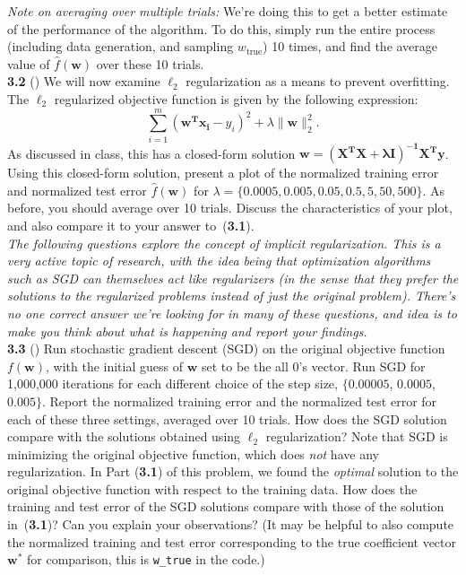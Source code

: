 \emph{Note on averaging over multiple trials:} We're doing this to get a better estimate of the performance of the algorithm. To do this, simply run the entire process (including data generation, and sampling $w_{\text{true}}$) 10 times, and find the average value of $\hat{f}(\textbf{w})$ over these 10 trials. \\


\textbf{3.2} () We will now examine $\ell_2$ regularization as a means to prevent overfitting. The $\ell_2$ regularized objective function is given by the following expression:
$$ \sum_{i=1}^{m} (\mathbf{w^T x_{i}}-{y}_{i})^2 + \lambda \| \mathbf{w}\|_2^2.$$
As discussed in class, this has a closed-form solution
$\textbf{w}=\mathbf{(X^TX+\lambda I)^{-1}X^Ty}$. Using this closed-form
solution, present a plot of the normalized training error and
normalized test error $\hat{f}(\textbf{w})$ for
$\lambda = \{0.0005, 0.005, 0.05, 0.5, 5, 50, 500\}$. As before, you
should average over 10 trials. Discuss the characteristics of your
plot, and also compare it to your answer to~(\textbf{3.1}).\\

\noindent \emph{The following questions explore the concept of implicit regularization. This is a very active topic of research, with the idea being that optimization algorithms such as SGD can themselves act like regularizers (in the sense that they prefer the solutions to the regularized problems instead of just the original problem). There's no one correct answer we're looking for in many of these questions, and idea is to make you think about what is happening and report your findings.}\\

\textbf{3.3} () Run stochastic gradient descent (SGD) on the original objective
function $f(\mathbf{w})$, with the initial guess of $\textbf{w}$ set to be the all 0's vector.  Run SGD for 1,000,000 iterations for each different choice of the step size, $\{0.00005$, $0.0005$, $0.005\}$.  Report the
 normalized training error and the normalized test
error for each of these three settings, averaged over 10 trials. How does the SGD solution compare with the
solutions obtained using $\ell_2$ regularization? Note that SGD is
minimizing the original objective function, which does \emph{not} have any
regularization. In Part (\textbf{3.1}) of this problem, we found the
\emph{optimal} solution to the original objective function with
respect to the training data. How does the training and test error of
the SGD solutions compare with those of the solution in~(\textbf{3.1})? 
Can you explain your observations?   (It may be helpful to also compute the normalized training and test error corresponding to the true coefficient vector $\textbf{w}^*$ for comparison, this is \verb|w_true| in the code.)\\

